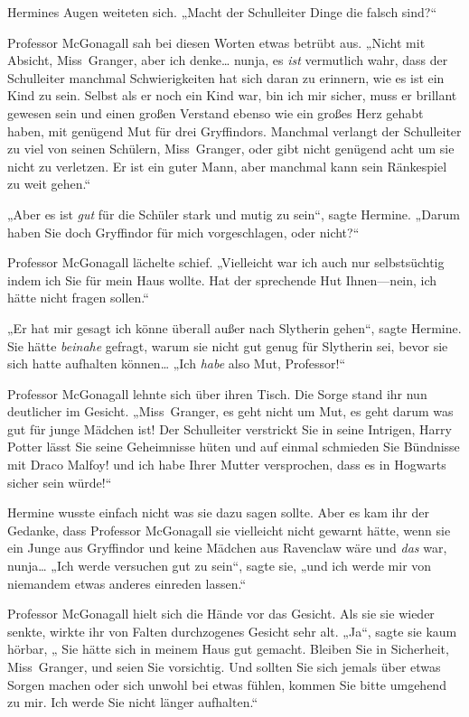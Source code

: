 {Hermines Augen weiteten sich. „Macht der Schulleiter Dinge die falsch sind?“

Professor McGonagall sah bei diesen Worten etwas betrübt aus. „Nicht mit Absicht, Miss~Granger, aber ich denke… nunja, es \emph{ist} vermutlich wahr, dass der Schulleiter manchmal Schwierigkeiten hat sich daran zu erinnern, wie es ist ein Kind zu sein. Selbst als er noch ein Kind war, bin ich mir sicher, muss er brillant gewesen sein und einen großen Verstand ebenso wie ein großes Herz gehabt haben, mit genügend Mut für drei Gryffindors. Manchmal verlangt der Schulleiter zu viel von seinen Schülern, Miss~Granger, oder gibt nicht genügend acht um sie nicht zu verletzen. Er ist ein guter Mann, aber manchmal kann sein Ränkespiel zu weit gehen.“

„Aber es ist \emph{gut} für die Schüler stark und mutig zu sein“, sagte Hermine. „Darum haben Sie doch Gryffindor für mich vorgeschlagen, oder nicht?“

Professor McGonagall lächelte schief. „Vielleicht war ich auch nur selbstsüchtig indem ich Sie für mein Haus wollte. Hat der sprechende Hut Ihnen—nein, ich hätte nicht fragen sollen.“

„Er hat mir gesagt ich könne überall außer nach Slytherin gehen“, sagte Hermine. Sie hätte \emph{beinahe} gefragt, warum sie nicht gut genug für Slytherin sei, bevor sie sich hatte aufhalten können… „Ich \emph{habe} also Mut, Professor!“

Professor McGonagall lehnte sich über ihren Tisch. Die Sorge stand ihr nun deutlicher im Gesicht. „Miss~Granger, es geht nicht um Mut, es geht darum was gut für junge Mädchen ist! Der Schulleiter verstrickt Sie in seine Intrigen, Harry Potter lässt Sie seine Geheimnisse hüten und auf einmal schmieden Sie Bündnisse mit Draco Malfoy! und ich habe Ihrer Mutter versprochen, dass es in Hogwarts sicher sein würde!“

Hermine wusste einfach nicht was sie dazu sagen sollte. Aber es kam ihr der Gedanke, dass Professor McGonagall sie vielleicht nicht gewarnt hätte, wenn sie ein Junge aus Gryffindor und keine Mädchen aus Ravenclaw wäre und \emph{das} war, nunja… „Ich werde versuchen gut zu sein“, sagte sie, „und ich werde mir von niemandem etwas anderes einreden lassen.“

Professor McGonagall hielt sich die Hände vor das Gesicht. Als sie sie wieder senkte, wirkte ihr von Falten durchzogenes Gesicht sehr alt. „Ja“, sagte sie kaum hörbar, „ Sie hätte sich in meinem Haus gut gemacht. Bleiben Sie in Sicherheit, Miss~Granger, und seien Sie vorsichtig. Und sollten Sie sich jemals über etwas Sorgen machen oder sich unwohl bei etwas fühlen, kommen Sie bitte umgehend zu mir. Ich werde Sie nicht länger aufhalten.“

}
